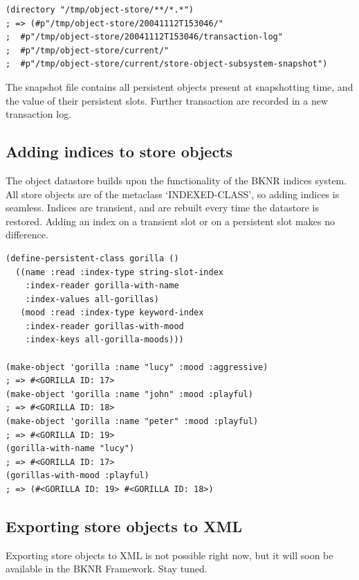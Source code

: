 \begin{Verbatim}[fontsize=\small,frame=leftline,framerule=0.9mm,rulecolor=\color{gray},framesep=5.1mm,xleftmargin=5mm,fontfamily=cmtt]
(directory "/tmp/object-store/**/*.*")
; => (#p"/tmp/object-store/20041112T153046/"
;  #p"/tmp/object-store/20041112T153046/transaction-log"
;  #p"/tmp/object-store/current/"
;  #p"/tmp/object-store/current/store-object-subsystem-snapshot")
\end{Verbatim}
The snapshot file contains all persistent objects present at
snapshotting time, and the value of their persistent
slots. Further transaction are recorded in a new transaction log.


\subsection{ Adding indices to store objects}
The object datastore builds upon the functionality of the BKNR
indices system. All store objects are of the metaclass
`INDEXED-CLASS', so adding indices is seamless. Indices are
transient, and are rebuilt every time the datastore is
restored. Adding an index on a transient slot or on a persistent
slot makes no difference.

\begin{Verbatim}[fontsize=\small,frame=leftline,framerule=0.9mm,rulecolor=\color{gray},framesep=5.1mm,xleftmargin=5mm,fontfamily=cmtt]
(define-persistent-class gorilla ()
  ((name :read :index-type string-slot-index
    :index-reader gorilla-with-name
    :index-values all-gorillas)
   (mood :read :index-type keyword-index
    :index-reader gorillas-with-mood
    :index-keys all-gorilla-moods)))

(make-object 'gorilla :name "lucy" :mood :aggressive)
; => #<GORILLA ID: 17>
(make-object 'gorilla :name "john" :mood :playful)
; => #<GORILLA ID: 18>
(make-object 'gorilla :name "peter" :mood :playful)
; => #<GORILLA ID: 19>
(gorilla-with-name "lucy")
; => #<GORILLA ID: 17>
(gorillas-with-mood :playful)
; => (#<GORILLA ID: 19> #<GORILLA ID: 18>)
\end{Verbatim}


\subsection{ Exporting store objects to XML}
Exporting store objects to XML is not possible right now, but it
will soon be available in the BKNR Framework. Stay tuned.


